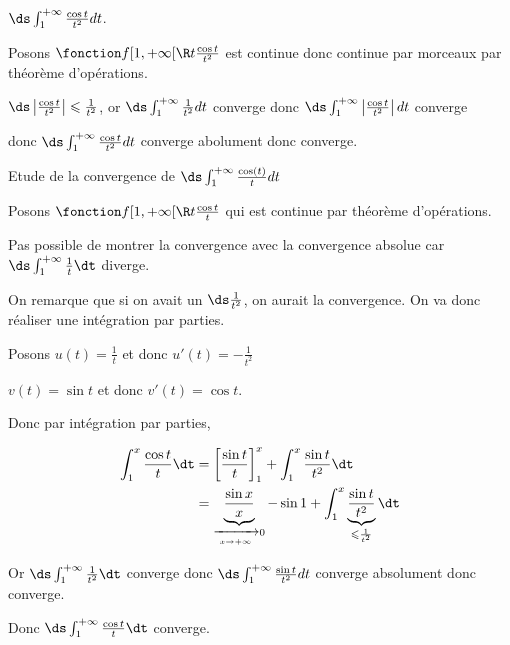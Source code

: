 \begin{exemple}
    $\ds \int_1^{+ \infty} \frac{\cos t}{t^2} dt$. 

    Posons $\fonction f {[1, + \infty[}{\R}{t}{\frac{\cos t}{t^2}}$ est continue donc continue par 
    morceaux par théorème d'opérations. 

    $ \ds \left| \frac{\cos t}{t^2} \right| \leqslant \frac{1}{t^2}$, or $\ds \int_1^{+ \infty} \frac{1}{t^2} dt$ converge donc
    $\ds \int_1^{+ \infty} \left| \frac{\cos t}{t^2} \right| dt$ converge
    
    donc $\ds \int_1^{+ \infty} \frac{\cos t}{t^2} dt$ converge abolument donc converge. 
\end{exemple}

\begin{exemple}
    Etude de la convergence de $\ds \int_1^{+ \infty} \frac{\cos(t)}{t} dt$

    Posons $\fonction f {[1, + \infty[}{\R}{t}{\frac{\cos t}{t}}$ qui est continue par théorème d'opérations.

    Pas possible de montrer la convergence avec la convergence absolue car $\ds \int_1^{+ \infty} \frac{1}{t} \dt$ diverge.

    On remarque que si on avait un $\ds \frac 1 {t^2}$, on aurait la convergence. On va donc 
    réaliser une intégration par parties.

    Posons $u(t) = \frac 1 t$ et donc $u'(t) = - \frac 1 {t^2}$ 

    $v(t) = \sin t$ et donc $v'(t) = \cos t$.

    Donc par intégration par parties, 

    \begin{align}
        \int_1^x \frac{\cos t}{t} \dt &= \left[ \frac{\sin t}{t} \right]_1^x + \int_1^x \frac{\sin t}{t^2} \dt \\
        &= \underbrace{\frac{\sin x}{x}}_{\xrightarrow[x \to + \infty   ]{} 0} - \sin 1 + \int_1^x \underbrace{\frac{\sin t}{t^2}}_{\leqslant \frac 1 {t^2}} \dt
    \end{align}

    Or $\ds \int_1^{+ \infty} \frac{1}{t^2} \dt$ converge donc $\ds \int_1^{+ \infty} \frac{\sin t}{t^2} dt$ converge absolument donc converge.

    Donc $\ds \int_1^{+ \infty} \frac{\cos t}{t} \dt$ converge.
\end{exemple}

